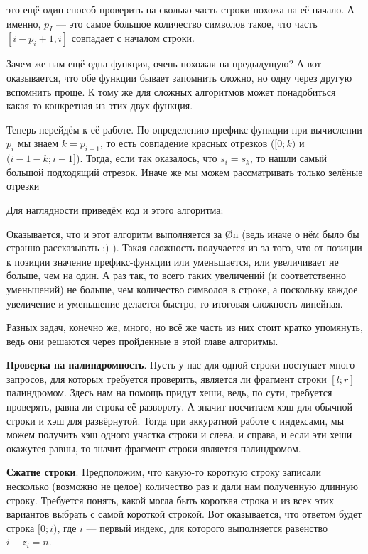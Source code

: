  это ещё один способ проверить на сколько часть строки похожа на её начало. А именно, $p_I$ — это самое большое количество символов такое, что часть $[i - p_i + 1, i]$ совпадает с началом строки.

Зачем же нам ещё одна функция, очень похожая на предыдущую? А вот оказывается, что обе функции бывает запомнить сложно, но одну через другую вспомнить проще. К тому же для сложных алгоритмов может понадобиться какая-то конкретная из этих двух функция.

\begin{wrapping}{0.5}
    Теперь перейдём к её работе. По определению префикс-функции при вычислении $p_i$ мы знаем $k=p_{i-1}$, то есть совпадение красных отрезков ($[0; k)$ и $(i - 1 - k; i - 1]$). Тогда, если так оказалось, что $s_i = s_k$, то нашли самый большой подходящий отрезок. Иначе же мы можем рассматривать только зелёные отрезки
\end{wrapping}

Для наглядности приведём код и этого алгоритма:

\nocode

Оказывается, что и этот алгоритм выполняется за \O{n} (ведь иначе о нём было бы странно рассказывать :) ). Такая сложность получается из-за того, что от позиции к позиции значение префикс-функции или уменьшается, или увеличивает не больше, чем на один. А раз так, то всего таких увеличений (и соответственно уменьшений) не больше, чем количество символов в строке, а поскольку каждое увеличение и уменьшение делается быстро, то итоговая сложность линейная.


Разных задач, конечно же, много, но всё же часть из них стоит кратко упомянуть, ведь они решаются через пройденные в этой главе алгоритмы. 

\textbf{Проверка на палиндромность}. Пусть у нас для одной строки поступает много запросов, для которых требуется проверить, является ли фрагмент строки $[l; r]$ палиндромом. Здесь нам на помощь придут хеши, ведь, по сути, требуется проверять, равна ли строка её развороту. А значит посчитаем хэш для обычной строки и хэш для развёрнутой. Тогда при аккуратной работе с индексами, мы можем получить хэш одного участка строки и слева, и справа, и если эти хеши окажутся равны, то значит фрагмент строки является палиндромом.

\textbf{Сжатие строки}. Предположим, что какую-то короткую строку записали несколько (возможно не целое) количество раз и дали нам полученную длинную строку. Требуется понять, какой могла быть короткая строка и из всех этих вариантов выбрать с самой короткой строкой. Вот оказывается, что ответом будет строка $[0; i)$, где $i$ — первый индекс, для которого выполняется равенство $i + z_i = n$.

